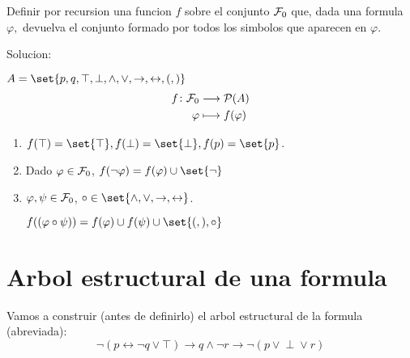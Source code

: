 \begin{example}
	Definir por recursion una funcion \(f \) sobre el conjunto \(\mathcal{\MakeUppercase{f}}_0 \) que, dada una formula \(\varphi, \) devuelva el conjunto formado por todos los simbolos que aparecen en \(\varphi\).

	Solucion:

	\(A = \set{p,q,\top,\perp,\wedge ,\vee ,\rightarrow,\leftrightarrow,(,)}\)
	\[
		\begin{aligned}
			f \colon \mathcal{\MakeUppercase{f}}_0 & \longrightarrow  \mathcal{\MakeUppercase{p}}(A) \\
			\varphi                                & \longmapsto  f(\varphi)
		\end{aligned}
	\]
	\begin{enumerate}
		\item \(f(\top) = \set{\top}, f(\perp) = \set{\perp}, f(p) = \set{p }\).
		\item Dado \(\varphi \in \mathcal{\MakeUppercase{f}}_0 \), \(f(\neg \varphi) = f(\varphi) \cup \set{\neg }\)
		\item \(\varphi, \psi \in \mathcal{\MakeUppercase{f}}_0 \), \(\circ \in \set{\wedge ,\vee ,\rightarrow,\leftrightarrow }\).

		      \(f((\varphi \circ \psi)) = f(\varphi) \cup  f(\psi) \cup \set{(,), \circ }\)
	\end{enumerate}

\end{example}

\section{Arbol estructural de una formula}
\begin{example}
	Vamos a construir (antes de definirlo) el arbol estructural de la formula (abreviada):
	\[
		\neg (p \leftrightarrow \neg q \vee \top) \rightarrow q \wedge \neg r \rightarrow \neg (p \vee \!\perp\! \vee  r)
	\]


\end{example}

